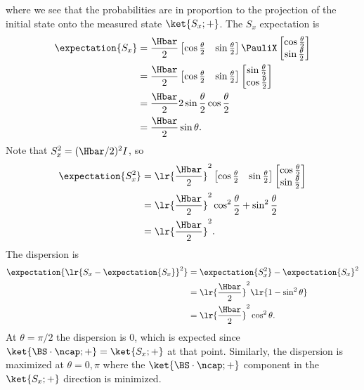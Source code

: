{where we see that the probabilities are in proportion to the projection of the initial state onto the measured state \( \ket{S_x ; +} \).
%
%
The \( S_x \) expectation is
%
\begin{equation}\label{eqn:moreBraKetProblems:780}
\begin{aligned}
\expectation{S_x}
&=
\frac{\Hbar}{2}
\begin{bmatrix}
\cos\frac{\theta}{2} & \sin\frac{\theta}{2}
\end{bmatrix}
\PauliX
\begin{bmatrix}
\cos\frac{\theta}{2} \\
\sin\frac{\theta}{2}
\end{bmatrix}
\\ &=
\frac{\Hbar}{2}
\begin{bmatrix}
\cos\frac{\theta}{2} & \sin\frac{\theta}{2}
\end{bmatrix}
\begin{bmatrix}
\sin\frac{\theta}{2} \\
\cos\frac{\theta}{2}
\end{bmatrix}
\\ &=
\frac{\Hbar}{2} 2 \sin\frac{\theta}{2} \cos\frac{\theta}{2}
\\ &=
\frac{\Hbar}{2} \sin\theta.
\end{aligned}
\end{equation}
%
Note that \( S_x^2 = (\Hbar/2)^2I \), so
%
\begin{equation}\label{eqn:moreBraKetProblems:800}
\begin{aligned}
\expectation{S_x^2}
&=
\lr{\frac{\Hbar}{2}}^2
\begin{bmatrix}
\cos\frac{\theta}{2} & \sin\frac{\theta}{2}
\end{bmatrix}
\begin{bmatrix}
\cos\frac{\theta}{2} \\
\sin\frac{\theta}{2}
\end{bmatrix}
\\ &=
\lr{ \frac{\Hbar}{2} }^2
\cos^2\frac{\theta}{2} + \sin^2 \frac{\theta}{2}
\\ &=
\lr{ \frac{\Hbar}{2} }^2.
\end{aligned}
\end{equation}
%
The dispersion is
%
\begin{equation}\label{eqn:moreBraKetProblems:820}
\begin{aligned}
\expectation{\lr{ S_x - \expectation{S_x}}^2}
&=
\expectation{S_x^2} - \expectation{S_x}^2
\\ &=
\lr{ \frac{\Hbar}{2} }^2
\lr{1 - \sin^2 \theta}
\\ &=
\lr{ \frac{\Hbar}{2} }^2
\cos^2 \theta.
\end{aligned}
\end{equation}
%
At \( \theta = \pi/2 \) the dispersion is 0, which is expected since \( \ket{\BS \cdot \ncap ; + } = \ket{ S_x ; + } \) at that point.  Similarly, the dispersion is maximized at \( \theta = 0,\pi \) where the \( \ket{\BS \cdot \ncap ; + } \) component in the \( \ket{S_x ; + } \) direction is minimized.
%
} %

